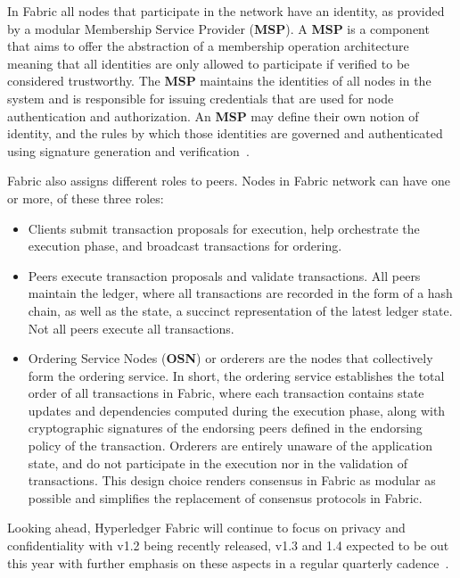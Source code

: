 In Fabric all nodes that participate in the network have an identity, as
provided by a modular Membership Service Provider (\textbf{MSP}).  A
\textbf{MSP} is a component that aims to offer the abstraction of a membership
operation architecture meaning that all identities are only allowed to
participate if verified to be considered trustworthy.  The \textbf{MSP}
maintains the identities of all nodes in the system and is responsible for
issuing credentials that are used for node authentication and authorization. An
\textbf{MSP} may define their own notion of identity, and the rules by which
those identities are governed and authenticated using signature generation and
verification~\cite{HyperledgerFabricDocs2017}.

Fabric also assigns different roles to peers. Nodes in Fabric network can have
one or more, of these three roles:

\begin{itemize}
  \item Clients submit transaction proposals for execution, help orchestrate
    the execution phase, and broadcast transactions for ordering.

  \item Peers execute transaction proposals and validate transactions.  All
    peers maintain the ledger, where all transactions  are recorded in the form
    of a hash chain, as well as the state, a succinct representation of the
    latest ledger state. Not all peers execute all transactions.

  \item Ordering Service Nodes (\textbf{OSN}) or orderers are the nodes that
    collectively form the ordering service. In short, the ordering service
    establishes the total order of all transactions in Fabric, where each
    transaction contains state updates and dependencies computed during the
    execution phase, along with cryptographic signatures of the endorsing peers
    defined in the endorsing policy of the transaction. Orderers are entirely
    unaware of the application state, and do not participate in the execution
    nor in the validation of transactions. This design choice renders consensus
    in Fabric as modular as possible and simplifies the replacement of
    consensus protocols in Fabric. 
\end{itemize}

Looking ahead, Hyperledger Fabric will continue to focus on privacy and
confidentiality with v1.2 being recently released, v1.3 and 1.4 expected to be
out this year with further emphasis on these aspects in a regular quarterly
cadence~\cite{hyperledgerRoadmap2018}.
